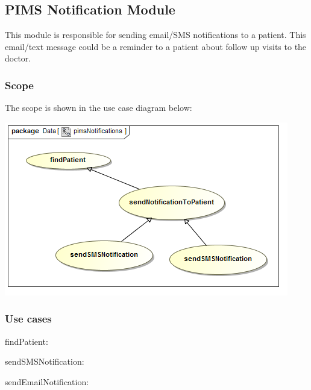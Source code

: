 \subsection{PIMS Notification Module}
This module is responsible for sending email/SMS notifications to a patient. This email/text message could be a reminder to a patient about follow up visits to the doctor. \par 

\subsubsection{Scope}
The scope is shown in the use case diagram below: \par
\includegraphics[width=0.75\linewidth]{./Graphics/pimsNotification/pimsNotifications}

\subsubsection{Use cases}
\begin{description}
	\item{findPatient:} 
	\item{sendSMSNotification:}
	\item{sendEmailNotification:}
\end{description}
